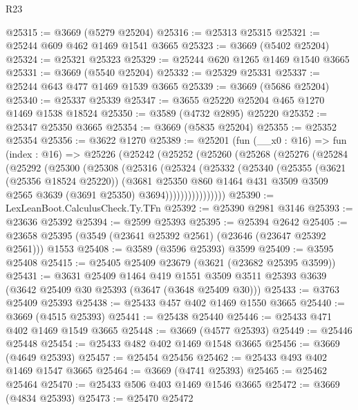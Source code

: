 \begin{lexlean}{R23}
\begin{coremodule}
@25315 := @3669 (@5279 @25204)
@25316 := @25313 @25315
@25321 := @25244 @609 @462 @1469 @1541 @3665
@25323 := @3669 (@5402 @25204)
@25324 := @25321 @25323
@25329 := @25244 @620 @1265 @1469 @1540 @3665
@25331 := @3669 (@5540 @25204)
@25332 := @25329 @25331
@25337 := @25244 @643 @477 @1469 @1539 @3665
@25339 := @3669 (@5686 @25204)
@25340 := @25337 @25339
@25347 := @3655 @25220 @25204 @465 @1270 @1469 @1538 @18524
@25350 := @3589 (@4732 @2895) @25220
@25352 := @25347 @25350 @3665
@25354 := @3669 (@5835 @25204)
@25355 := @25352 @25354
@25356 := @3622 @1270
@25389 := @25201
    (fun (__x0 : @16) =>
    fun (index : @16) =>
    @25226
      (@25242
        (@25252
          (@25260
            (@25268
              (@25276
                (@25284
                  (@25292
                    (@25300
                      (@25308
                        (@25316
                          (@25324
                            (@25332
                              (@25340
                                (@25355
                                  (@3621 (@25356 @18524 @25220))
                                  (@3681
                                    @25350
                                    @860
                                    @1464
                                    @431
                                    @3509
                                    @3509
                                    @2565
                                    @3639
                                    (@3691 @25350)
                                    @3694))))))))))))))))
@25390 := LexLeanBoot.CalculusCheck.Ty.TFn
@25392 := @25390 @2981 @3146
@25393 := @23636 @25392
@25394 := @2599 @25393
@25395 := @25394 @2642
@25405 := @23658 @25395 (@3549 (@23641 @25392 @2561) (@23646 (@23647 @25392 @2561))) @1553
@25408 := @3589 (@3596 @25393) @3599
@25409 := @3595 @25408
@25415 := @25405 @25409 @23679 (@3621 (@23682 @25395 @3599))
@25431 := @3631
    @25409
    @1464
    @419
    @1551
    @3509
    @3511
    @25393
    @3639
    (@3642 @25409 @30 @25393 (@3647 (@3648 @25409 @30)))
@25433 := @3763 @25409 @25393
@25438 := @25433 @457 @402 @1469 @1550 @3665
@25440 := @3669 (@4515 @25393)
@25441 := @25438 @25440
@25446 := @25433 @471 @402 @1469 @1549 @3665
@25448 := @3669 (@4577 @25393)
@25449 := @25446 @25448
@25454 := @25433 @482 @402 @1469 @1548 @3665
@25456 := @3669 (@4649 @25393)
@25457 := @25454 @25456
@25462 := @25433 @493 @402 @1469 @1547 @3665
@25464 := @3669 (@4741 @25393)
@25465 := @25462 @25464
@25470 := @25433 @506 @403 @1469 @1546 @3665
@25472 := @3669 (@4834 @25393)
@25473 := @25470 @25472

\end{coremodule}
\end{lexlean}
